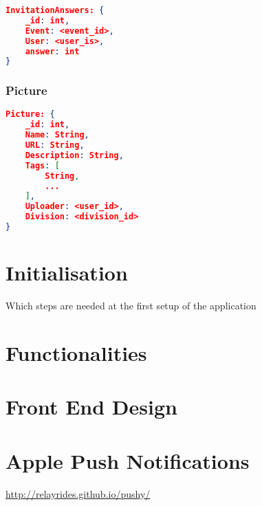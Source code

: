 \begin{lstlisting}[language=json, caption=\emph{InvitationAnswers}-document store]
InvitationAnswers: {
    _id: int,  
    Event: <event_id>,
    User: <user_is>,
    answer: int
}
\end{lstlisting}

\subsection{Picture}

\begin{lstlisting}[language=json, caption=\emph{Picture}-document store]
Picture: {
    _id: int,  
    Name: String,
    URL: String,
    Description: String,
    Tags: [
        String,
        ...
    ],
    Uploader: <user_id>,
    Division: <division_id>
}
\end{lstlisting}

\chapter{Initialisation}
Which steps are needed at the first setup of the application

\chapter{Functionalities}

\chapter{Front End Design}

\chapter{Apple Push Notifications}
\url{http://relayrides.github.io/pushy/}

